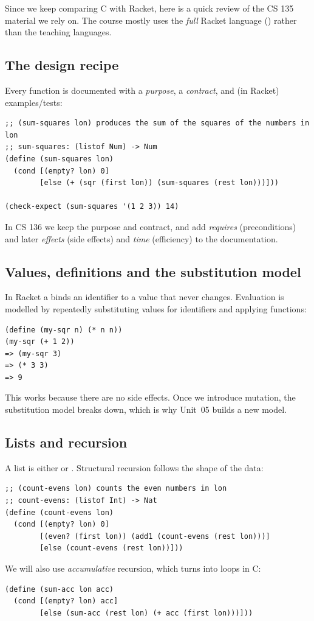 Since we keep comparing C with Racket, here is a quick review of the CS 135 material we rely
on. The course mostly uses the \emph{full} Racket language () rather than
the teaching languages.

\subsection{The design recipe}

Every function is documented with a \emph{purpose}, a \emph{contract}, and (in Racket)
examples/tests:
\begin{lstlisting}[style=racket]
;; (sum-squares lon) produces the sum of the squares of the numbers in lon
;; sum-squares: (listof Num) -> Num
(define (sum-squares lon)
  (cond [(empty? lon) 0]
        [else (+ (sqr (first lon)) (sum-squares (rest lon)))]))

(check-expect (sum-squares '(1 2 3)) 14)
\end{lstlisting}
In CS 136 we keep the purpose and contract, and add \emph{requires} (preconditions) and later
\emph{effects} (side effects) and \emph{time} (efficiency) to the documentation.

\subsection{Values, definitions and the substitution model}

In Racket a  binds an identifier to a value that never changes. Evaluation is
modelled by repeatedly substituting values for identifiers and applying functions:
\begin{lstlisting}[style=racket]
(define (my-sqr n) (* n n))
(my-sqr (+ 1 2))
=> (my-sqr 3)
=> (* 3 3)
=> 9
\end{lstlisting}
This works because there are no side effects. Once we introduce mutation, the substitution
model breaks down, which is why Unit~05 builds a new model.

\subsection{Lists and recursion}

A list is either  or . Structural recursion follows the shape
of the data:
\begin{lstlisting}[style=racket]
;; (count-evens lon) counts the even numbers in lon
;; count-evens: (listof Int) -> Nat
(define (count-evens lon)
  (cond [(empty? lon) 0]
        [(even? (first lon)) (add1 (count-evens (rest lon)))]
        [else (count-evens (rest lon))]))
\end{lstlisting}
We will also use \emph{accumulative} recursion, which turns into loops in C:
\begin{lstlisting}[style=racket]
(define (sum-acc lon acc)
  (cond [(empty? lon) acc]
        [else (sum-acc (rest lon) (+ acc (first lon)))]))
\end{lstlisting}

